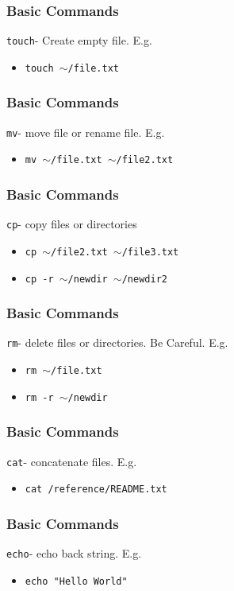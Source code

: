 \documentclass{beamer}
\newcommand{\code}[1]{\colorbox{codegray}{\texttt{#1}}}
\begin{document}
\begin{frame}
\frametitle{Basic Commands}
\code{touch}- Create empty file. E.g.
\bigskip
\begin{itemize}
    \item \code{touch $\sim$/file.txt}
\end{itemize}
\end{frame}


\begin{frame}
\frametitle{Basic Commands}
\code{mv}- move file or rename file. E.g.
\bigskip
\begin{itemize}
    \item \code{mv $\sim$/file.txt $\sim$/file2.txt}
\end{itemize}
\end{frame}

\begin{frame}
\frametitle{Basic Commands}
\code{cp}- copy files or directories
\bigskip
\begin{itemize}
    \item \code{cp $\sim$/file2.txt $\sim$/file3.txt}
    \pause
    \bigskip
    \item \code{cp -r $\sim$/newdir $\sim$/newdir2}
\end{itemize}
\end{frame}


\begin{frame}
\frametitle{Basic Commands}
\code{rm}- delete files or directories. Be Careful. E.g.
\bigskip
\begin{itemize}
    \item \code{rm $\sim$/file.txt}
    \pause
    \bigskip
    \item \code{rm -r $\sim$/newdir}
\end{itemize}
\end{frame}


\begin{frame}
\frametitle{Basic Commands}
\code{cat}- concatenate files. E.g.
\bigskip
\begin{itemize}
    \item \code{cat /reference/README.txt}
\end{itemize}
\end{frame}


\begin{frame}
\frametitle{Basic Commands}
\code{echo}- echo back string. E.g.
\bigskip
\begin{itemize}
    \item \code{echo "Hello World"}
\end{itemize}
\end{frame}
\end{document}
